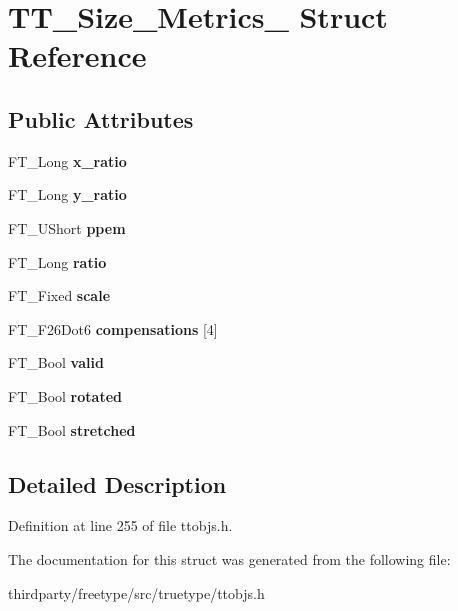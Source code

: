 \hypertarget{struct_t_t___size___metrics__}{}\section{T\+T\+\_\+\+Size\+\_\+\+Metrics\+\_\+ Struct Reference}
\label{struct_t_t___size___metrics__}
\subsection*{Public Attributes}
\begin{DoxyCompactItemize}
\item 
\mbox{\label{struct_t_t___size___metrics___afe2abe53854d81fc690d8076663aa014}} 
F\+T\+\_\+\+Long {\bfseries x\+\_\+ratio}
\item 
\mbox{\label{struct_t_t___size___metrics___ab1746b4c39fbe9750e1a0c6fd5b0df04}} 
F\+T\+\_\+\+Long {\bfseries y\+\_\+ratio}
\item 
\mbox{\label{struct_t_t___size___metrics___aeb81d06460f0a8b95c8b4d53e5e73fcc}} 
F\+T\+\_\+\+U\+Short {\bfseries ppem}
\item 
\mbox{\label{struct_t_t___size___metrics___abd4b03cbbf2ba09884bd8109a968f93f}} 
F\+T\+\_\+\+Long {\bfseries ratio}
\item 
\mbox{\label{struct_t_t___size___metrics___ac13aee69211ee82fe67eb5e828125b30}} 
F\+T\+\_\+\+Fixed {\bfseries scale}
\item 
\mbox{\label{struct_t_t___size___metrics___a7f8d48f9516608eb13b811efd5ad99bb}} 
F\+T\+\_\+\+F26\+Dot6 {\bfseries compensations} \mbox{[}4\mbox{]}
\item 
\mbox{\label{struct_t_t___size___metrics___a33578f5791bd8452d95f92aff1de4bde}} 
F\+T\+\_\+\+Bool {\bfseries valid}
\item 
\mbox{\label{struct_t_t___size___metrics___a1ec91582495e1314e1e7b6bb118600a9}} 
F\+T\+\_\+\+Bool {\bfseries rotated}
\item 
\mbox{\label{struct_t_t___size___metrics___a9b25bf7f7538b9c71b06d382202fa392}} 
F\+T\+\_\+\+Bool {\bfseries stretched}
\end{DoxyCompactItemize}


\subsection{Detailed Description}


Definition at line 255 of file ttobjs.\+h.



The documentation for this struct was generated from the following file\+:\begin{DoxyCompactItemize}
\item 
thirdparty/freetype/src/truetype/ttobjs.\+h\end{DoxyCompactItemize}
